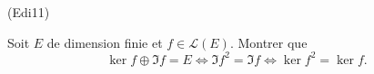 \begin{tiny}(Edi11)\end{tiny} Soit $E$ de dimension finie et $f\in \mathcal{L}(E)$. Montrer que
\[
 \ker f \oplus \Im f = E \Leftrightarrow \Im f^2 = \Im f \Leftrightarrow \ker f^2 = \ker f.
\]
